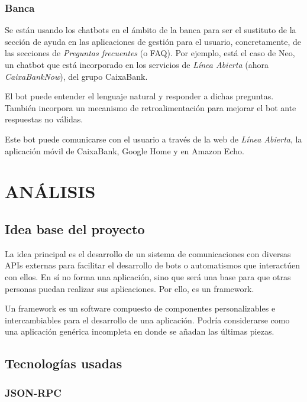 \documentclass[spanish,12pt, a4paper, twoside]{paper}
\let\oldsection\section
\def\section{\cleardoublepage\oldsection}
\begin{document}
\subsubsection{Banca}

Se están usando los chatbots en el ámbito de la banca para ser el sustituto de la sección de ayuda en las aplicaciones de gestión para el usuario, concretamente, de las secciones de \emph{Preguntas frecuentes} (o FAQ). Por ejemplo, está el caso de Neo, un chatbot que está incorporado en los servicios de \emph{Línea Abierta} (ahora \emph{CaixaBankNow}), del grupo CaixaBank.
\newline

El bot puede entender el lenguaje natural y responder a dichas preguntas. También incorpora un mecanismo de retroalimentación para mejorar el bot ante respuestas no válidas.

Este bot puede comunicarse con el usuario a través de la web de \emph{Línea Abierta}, la aplicación móvil de CaixaBank, Google Home y en Amazon Echo.

\section{ANÁLISIS}

\subsection{Idea base del proyecto}

La idea principal es el desarrollo de un sistema de comunicaciones con diversas APIs externas para facilitar el desarrollo de bots o automatismos que interactúen con ellos. En sí no forma una aplicación, sino que será una base para que otras personas puedan realizar sus aplicaciones. Por ello, es un framework.
\newline

Un framework es un software compuesto de componentes personalizables e intercambiables para el desarrollo de una aplicación. Podría considerarse como una aplicación genérica incompleta en donde se añadan las últimas piezas. \cite[pág. 1]{FrameworkJJG}

\subsection{Tecnologías usadas}

\subsubsection{JSON-RPC}
\end{document}
